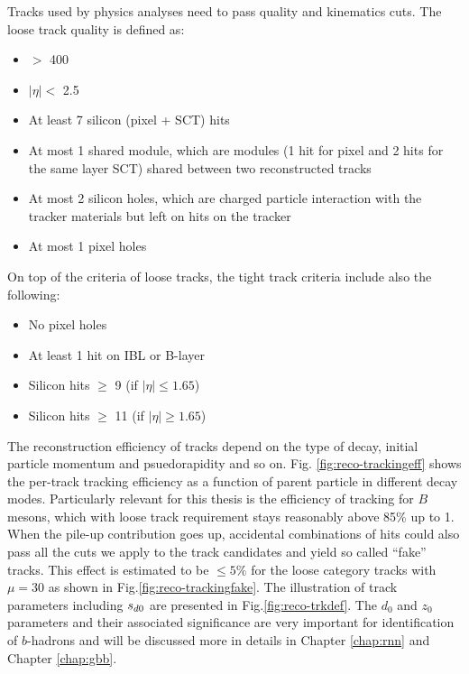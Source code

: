 Tracks used by physics analyses need to pass quality and kinematics cuts. The loose track quality\cite{ATL-PHYS-PUB-2015-018} is defined as:

\begin{itemize}
\item \pT $>$ 400 \mev
\item $|\eta| < $ 2.5
\item At least 7 silicon (pixel + SCT) hits
\item At most 1 shared module, which are modules (1 hit for pixel and 2 hits for the same layer SCT) shared between two reconstructed tracks
\item At most 2 silicon holes, which are charged particle interaction with the tracker materials but left on hits on the tracker 
\item At most 1 pixel holes
\end{itemize}

On top of the criteria of loose tracks, the tight track criteria\cite{ATL-PHYS-PUB-2015-018} include also the following:

\begin{itemize}
\item No pixel holes
\item At least 1 hit on IBL or B-layer
\item Silicon hits $\geq$ 9 (if $|\eta|\leq 1.65$)
\item Silicon hits $\geq$ 11 (if $|\eta|\geq 1.65$)
\end{itemize}

The reconstruction efficiency of tracks depend on the type of decay, initial particle momentum and psuedorapidity and so on. Fig. \ref{fig:reco-trackingeff} shows the per-track tracking efficiency as a function of parent particle \pt in different decay modes. Particularly relevant for this thesis is the efficiency of tracking for $B$ mesons, which with loose track requirement stays reasonably above 85\% up to 1\TeV. When the pile-up contribution goes up, accidental combinations of hits could also pass all the cuts we apply to the track candidates and yield so called ``fake'' tracks. This effect is estimated to be $\leq 5\%$ for the loose category tracks with $\mu = 30$ as shown in Fig.\ref{fig:reco-trackingfake}.  The illustration of track parameters including $s_{d0}$ are presented in Fig.\ref{fig:reco-trkdef}. The $d_0$ and $z_0$ parameters and their associated significance are very important for identification of $b$-hadrons and will be discussed more in details in Chapter \ref{chap:rnn} and Chapter \ref{chap:gbb}.


